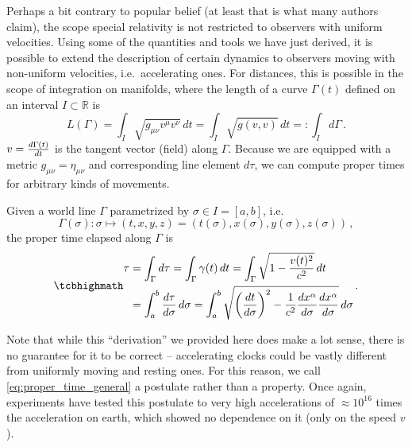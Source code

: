 Perhaps a bit contrary to popular belief (at least that is what many authors claim), the scope special relativity is not restricted to observers with uniform velocities. Using some of the quantities and tools we have just derived, it is possible to extend the description of certain dynamics to observers moving with non-uniform velocities, i.e.~accelerating ones. For distances, this is possible in the scope of integration on manifolds, where the length of a curve $\Gamma(t)$ defined on an interval $I \subset \mathbb{R}$ is
\begin{equation*}
	L(\Gamma) = \int_I \sqrt{g_{\mu \nu} v^\mu v^\nu} \, dt = \int_I \sqrt{g(v, v)} \, dt =: \int_I d\Gamma \, .
\end{equation*}
$v = \dv{\Gamma(t)}{t}$ is the tangent vector (field) along $\Gamma$. Because we are equipped with a metric $g_{\mu \nu} = \eta_{\mu \nu}$ and corresponding line element $d\tau$, we can compute proper times for arbitrary kinds of movements.
\begin{post}
	Given a world line $\Gamma$ parametrized by $\sigma \in I = [a, b]$, i.e.
	\begin{equation*}
		\Gamma(\sigma): \sigma \mapsto (t, x, y, z) = (t(\sigma), x(\sigma), y(\sigma), z(\sigma)) \, ,
	\end{equation*}
	the proper time elapsed along $\Gamma$ is
	\begin{equation}\label{eq:proper_time_general}
		\eqbox{
		\begin{split}
		\tau &= \int_\Gamma d\tau = \int_\Gamma \gamma(t) \, dt = \int_\Gamma \sqrt{1 - \frac{v(t)^2}{c^2}} \, dt
		\\
		&= \int_a^b \dv{\tau}{\sigma} \, d\sigma = \int_a^b \sqrt{\qty(\dv{t}{\sigma})^2 - \frac{1}{c^2} \dv{x^\alpha}{\sigma} \dv{x^\alpha}{\sigma}} \, d\sigma
		\end{split}
		} \, .
	\end{equation}
\end{post}
Note that while this \enquote{derivation} we provided here does make a lot sense, there is no guarantee for it to be correct -- accelerating clocks could be vastly different from uniformly moving and resting ones. For this reason, we call \eqref{eq:proper_time_general} a postulate rather than a property. Once again, experiments have tested this postulate to very high accelerations of $\approx 10^{16}$ times the acceleration on earth, which showed no dependence on it (only on the speed $v$).


